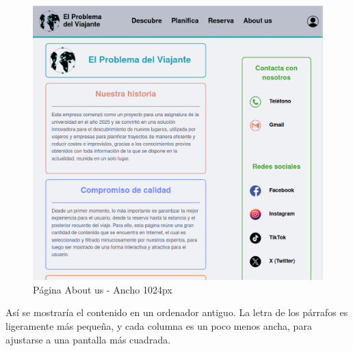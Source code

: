 \documentclass[11pt, a4paper]{book}
\begin{document}
	\begin{figure} [H]
		\centering
		\includegraphics[height=0.4\textheight]{CSS/3-3 1024.png}
		\caption{Página About us - Ancho 1024px}
	\end{figure}

	Así se mostraría el contenido en un ordenador antiguo. La letra de los párrafos es ligeramente más pequeña, y cada columna es un poco menos ancha, para ajustarse a una pantalla más cuadrada.
\end{document}
